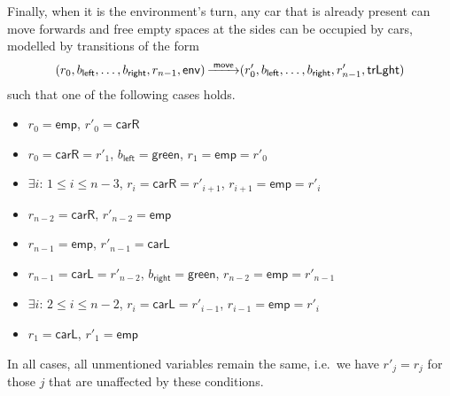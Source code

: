 Finally, when it is the environment's turn, any car that is already present can move forwards and free empty spaces at the sides can
be occupied by cars, modelled by transitions of the form
\begin{displaymath}
\Transition{(r_0,b_{\mathsf{left}},\ldots,b_{\mathsf{right}},r_{n-1},\mathsf{env})}{\mathsf{move}}{(r'_0,b_{\mathsf{left}},\ldots,b_{\mathsf{right}},r'_{n-1},\mathsf{trLght})}
\end{displaymath}
such that one of the following cases holds.
\begin{itemize}
\item $r_0 = \mathsf{emp}$, $r'_0 = \mathsf{carR}$
\item $r_0 = \mathsf{carR} = r'_1$, $b_{\mathsf{left}} = \mathsf{green}$, $r_1 = \mathsf{emp} = r'_0$ 
\item $\exists i$: $1 \le i \le n-3$, $r_i = \mathsf{carR} = r'_{i+1}$, $r_{i+1} = \mathsf{emp} = r'_i$  
\item $r_{n-2} = \mathsf{carR}$, $r'_{n-2} = \mathsf{emp}$ 
\item $r_{n-1} = \mathsf{emp}$, $r'_{n-1} = \mathsf{carL}$
\item $r_{n-1} = \mathsf{carL} = r'_{n-2}$, $b_{\mathsf{right}} = \mathsf{green}$, $r_{n-2} = \mathsf{emp} = r'_{n-1}$ 
\item $\exists i$: $2 \le i \le n-2$, $r_i = \mathsf{carL} = r'_{i-1}$, $r_{i-1} = \mathsf{emp} = r'_i$  
\item $r_1 = \mathsf{carL}$, $r'_1 = \mathsf{emp}$ 
\end{itemize}
In all cases, all unmentioned variables remain the same, i.e.\ we have $r'_j = r_j$ for those $j$ that are unaffected by these
conditions.

